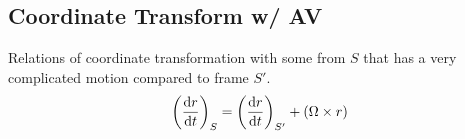 \documentclass{article} \usepackage{amsmath} \usepackage{amssymb} \usepackage{amsthm} \usepackage[margin=0.2in]{geometry} \usepackage{hyperref} \usepackage{physics} \usepackage{tikz} \usepackage{mathtools} \mathtoolsset{showonlyrefs} \theoremstyle{definition} \newtheorem{theorem}{Theorem}[section] \newtheorem{corollary}{Corollary}[theorem] \newtheorem{lemma}[theorem]{Lemma} \newtheorem{definition}{Definition}[section] \author{Connor Duncan} \date{\today}
\begin{document}
\subsection{Coordinate Transform w/ AV} Relations of coordinate transformation with some from $S$ that has a very complicated motion compared to frame $S'$. \begin{equation} \left(\dv{r}{t}\right)_S=\left(\dv{r}{t}\right)_{S'}+(\Omega\times r) \end{equation}
\end{document}
